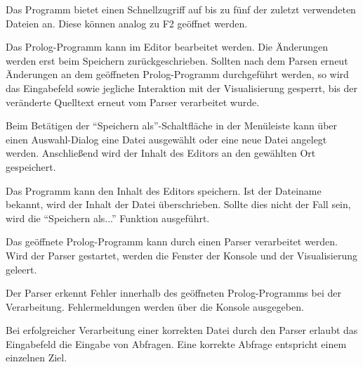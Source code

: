 \documentclass[parskip=full,11pt,twoside]{scrartcl}
\begin{document}

Das Programm bietet einen Schnellzugriff auf bis zu fünf der zuletzt verwendeten Dateien an. Diese können analog zu F2 geöffnet werden.


Das Prolog-Programm kann im Editor bearbeitet werden. Die Änderungen werden erst beim Speichern zurückgeschrieben. Sollten nach dem Parsen erneut Änderungen an dem geöffneten Prolog-Programm durchgeführt werden, so wird das Eingabefeld sowie jegliche Interaktion mit der Visualisierung gesperrt, bis der veränderte Quelltext erneut vom Parser verarbeitet wurde.


Beim Betätigen der \enquote{Speichern als}-Schaltfläche in der Menüleiste kann über einen Auswahl-Dialog eine Datei ausgewählt oder eine neue Datei angelegt werden. Anschließend wird der Inhalt des Editors an den gewählten Ort gespeichert.


Das Programm kann den Inhalt des Editors speichern. Ist der Dateiname bekannt, wird der Inhalt der Datei überschrieben. Sollte dies nicht der Fall sein, wird die \enquote{Speichern als...} Funktion ausgeführt.


Das geöffnete Prolog-Programm kann durch einen Parser verarbeitet werden. Wird der Parser gestartet, werden die Fenster der Konsole und der Visualisierung geleert.


Der Parser erkennt Fehler innerhalb des geöffneten Prolog-Programms bei der Verarbeitung. Fehlermeldungen werden über die Konsole ausgegeben.


Bei erfolgreicher Verarbeitung einer korrekten Datei durch den Parser erlaubt das Eingabefeld die Eingabe von Abfragen. Eine korrekte Abfrage entspricht einem einzelnen Ziel.
\end{document}
